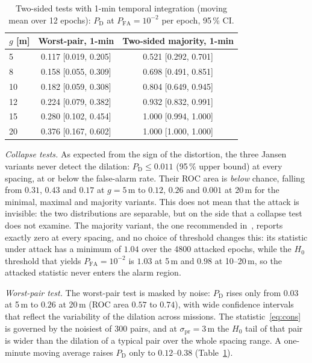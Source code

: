 \documentclass[conference]{IEEEtran}
\newcommand{\PD}{P_{\mathrm{D}}}
\newcommand{\PFA}{P_{\mathrm{FA}}}
\begin{document}
\begin{table}[!t]
\caption{Two-sided tests with 1-min temporal integration (moving mean
over 12 epochs): $\PD$ at $\PFA=10^{-2}$ per epoch, 95\,\% CI.}
\label{tab:window}
\centering
\begin{tabular}{l cc}
\toprule
$g$ [m] & Worst-pair, 1-min & Two-sided majority, 1-min \\
\midrule
 5 & 0.117 [0.019, 0.205] & 0.521 [0.292, 0.701] \\
 8 & 0.158 [0.055, 0.309] & 0.698 [0.491, 0.851] \\
10 & 0.182 [0.059, 0.308] & 0.804 [0.649, 0.945] \\
12 & 0.224 [0.079, 0.382] & 0.932 [0.832, 0.991] \\
15 & 0.280 [0.102, 0.454] & 1.000 [0.994, 1.000] \\
20 & 0.376 [0.167, 0.602] & 1.000 [1.000, 1.000] \\
\bottomrule
\end{tabular}
\end{table}

\emph{Collapse tests.} As expected from the sign of the distortion, the
three Jansen variants never detect the dilation: $\PD\le0.011$ (95\,\%
upper bound) at every spacing, at or below the false-alarm rate. Their
ROC area is \emph{below} chance, falling from $0.31$, $0.43$ and $0.17$
at $g=5$\,m to $0.12$, $0.26$ and $0.001$ at 20\,m for the minimal,
maximal and majority variants. This does not mean that the attack is
invisible: the two distributions are separable, but on the side that a
collapse test does not examine. The majority variant, the one
recommended in~\cite{jansen2016multireceiver}, reports exactly zero at
every spacing, and no choice of threshold changes this: its statistic
under attack has a minimum of $1.04$ over the 4800 attacked epochs,
while the $H_0$ threshold that yields $\PFA=10^{-2}$ is $1.03$ at 5\,m
and $0.98$ at 10--20\,m, so the attacked statistic never enters the
alarm region.

\emph{Worst-pair test.} The worst-pair test is masked by noise: $\PD$
rises only from $0.03$ at 5\,m to $0.26$ at 20\,m (ROC area $0.57$ to
$0.74$),
with wide confidence intervals that reflect the variability of the
dilation across missions. The statistic~\eqref{eq:cons} is governed by
the noisiest of 300 pairs, and at $\sigma_{\mathrm{pr}}=3$\,m the $H_0$
tail of that pair is wider than the dilation of a typical pair over the
whole spacing range. A one-minute moving average raises $\PD$ only to
$0.12$--$0.38$ (Table~\ref{tab:window}).
\end{document}

